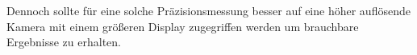 Dennoch sollte für eine solche Präzisionsmessung besser auf eine höher auflösende Kamera mit einem größeren Display zugegriffen werden um brauchbare Ergebnisse zu erhalten.




